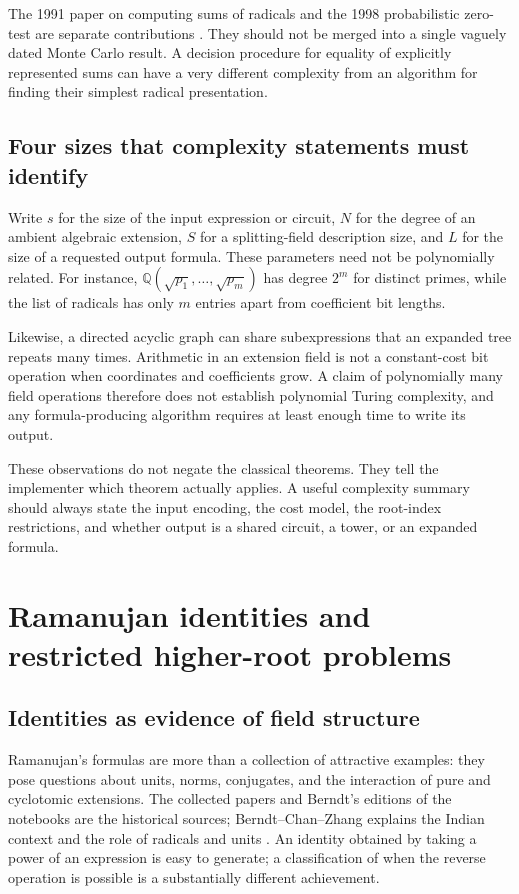 \documentclass[11pt,a4paper]{article}
\numberwithin{equation}{section}
\theoremstyle{definition}\newtheorem{definition}[theorem]{Definition}
\theoremstyle{remark}\newtheorem{remark}[theorem]{Remark}
\newcommand{\Q}{\mathbb Q}\newcommand{\R}{\mathbb R}\newcommand{\C}{\mathbb C}\newcommand{\Z}{\mathbb Z}
\begin{document}
The 1991 paper on computing sums of radicals and the 1998 probabilistic zero-test are separate contributions \cite{bloemer91,bloemer98}. They should not be merged into a single vaguely dated Monte Carlo result. A decision procedure for equality of explicitly represented sums can have a very different complexity from an algorithm for finding their simplest radical presentation.

\subsection{Four sizes that complexity statements must identify}
Write $s$ for the size of the input expression or circuit, $N$ for the degree of an ambient algebraic extension, $S$ for a splitting-field description size, and $L$ for the size of a requested output formula. These parameters need not be polynomially related. For instance, $\Q(\sqrt{p_1},\ldots,\sqrt{p_m})$ has degree $2^m$ for distinct primes, while the list of radicals has only $m$ entries apart from coefficient bit lengths.

Likewise, a directed acyclic graph can share subexpressions that an expanded tree repeats many times. Arithmetic in an extension field is not a constant-cost bit operation when coordinates and coefficients grow. A claim of polynomially many field operations therefore does not establish polynomial Turing complexity, and any formula-producing algorithm requires at least enough time to write its output.

These observations do not negate the classical theorems. They tell the implementer which theorem actually applies. A useful complexity summary should always state the input encoding, the cost model, the root-index restrictions, and whether output is a shared circuit, a tower, or an expanded formula.

\section{Ramanujan identities and restricted higher-root problems}
\label{sec:ramanujan}

\subsection{Identities as evidence of field structure}
Ramanujan's formulas are more than a collection of attractive examples: they pose questions about units, norms, conjugates, and the interaction of pure and cyclotomic extensions. The collected papers and Berndt's editions of the notebooks are the historical sources; Berndt--Chan--Zhang explains the Indian context and the role of radicals and units \cite{ramanujan,berndtIV,berndtV,berndt97,berndt98}. An identity obtained by taking a power of an expression is easy to generate; a classification of when the reverse operation is possible is a substantially different achievement.
\end{document}
